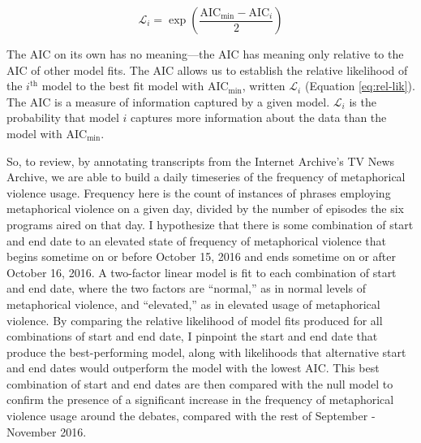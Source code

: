 \begin{equation}
  \mathcal{L}_i = \exp\left(\frac{\mathrm{AIC_{min}} - \mathrm{AIC}_i}{2} \right)
  \label{eq:rel-lik}
\end{equation}

\noindent
The AIC on its own has no meaning---the AIC has meaning only relative to the AIC of
other model fits. The AIC allows us to establish the relative likelihood of
the $i^{\mathrm{th}}$ model to the best fit model with $\mathrm{AIC_{min}}$, 
written $\mathcal{L}_i$ (Equation \ref{eq:rel-lik}). The AIC is a measure of
information captured by a given model. $\mathcal{L}_i$ is the probability that 
model $i$ captures more information about the data than the model with $\mathrm{AIC_{min}}$.

So, to review, by annotating transcripts from the Internet Archive's
TV News Archive, we are able to build a daily timeseries of the frequency of
metaphorical violence usage. Frequency here is the count of instances of phrases
employing metaphorical violence on a given day, divided by the number of
episodes the six programs aired on that day. I hypothesize that there is some
combination of start and end date to an elevated state of frequency of metaphorical
violence that begins sometime on or before October 15, 2016 and ends sometime on or after 
October 16, 2016. A two-factor linear model is fit to each combination of 
start and end date, where the two factors are ``normal,'' as in normal levels
of metaphorical violence, and ``elevated,'' as in elevated usage of
metaphorical violence. By comparing the relative likelihood of 
model fits produced for all combinations of start and end date, I pinpoint
the start and end date that produce the best-performing model, along with
likelihoods that alternative start and end dates would outperform the model
with the lowest AIC. This best combination of start and end dates are then 
compared with the null model to confirm the presence of a 
significant increase in the frequency of metaphorical violence usage around the
debates, compared with the rest of September - November 2016.
